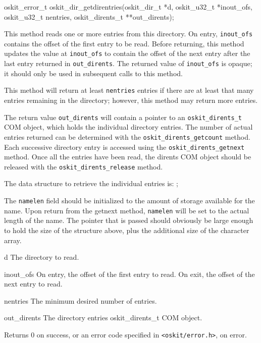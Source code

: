 \begin{apisyn}

	\funcproto oskit_error_t
	oskit_dir_getdirentries(oskit_dir_t *d, 
				oskit_u32_t *inout_ofs,
				oskit_u32_t nentries,
				\outparam oskit_dirents_t **out_dirents);
\end{apisyn}
\ostofs
\begin{apidesc}
	This method reads one or more entries from this
	directory.  On entry, {\tt inout_ofs} contains the	
	offset of the first entry to be read.  Before
	returning, this method updates the value at 
	{\tt inout_ofs} to contain the offset of the
	next entry after the last entry	returned in
	{\tt out_dirents}.  The returned value of 
	{\tt inout_ofs} is opaque; it should only be used 
	in subsequent calls to this method.

	This method will return at least {\tt nentries}
	entries if there are at least that many entries
	remaining in the directory; however, this method
	may return more entries.

	The return value {\tt out_dirents} will contain a pointer to
	an {\tt oskit_dirents_t} COM object, which holds the individual
	directory entries. The number of actual entries returned can be
	determined with the {\tt oskit_dirents_getcount} method. Each
	successive directory entry is accessed using the
	{\tt oskit_dirents_getnext} method. Once all the entries have
	been read, the dirents COM object should be released with the
	{\tt oskit_dirents_release} method.

	The data structure to retrieve the individual entries is:
	;

	The {\tt namelen} field should be initialized to the amount of
	storage available for the name. Upon return from the getnext
	method, {\tt namelen} will be set to the actual length of the
	name. The pointer that is passed should obviously be large
	enough to hold the size of the structure above, plus the
	additional size of the character array.

\end{apidesc}
\begin{apiparm}
	\item[d]
		The directory to read.
	\item[inout_ofs]
		On entry, the offset of the first entry to read.
		On exit, the offset of the next entry to read.
	\item[nentries]
		The minimum desired number of entries.
	\item[out_dirents]
		The directory entries oskit_dirents_t COM object.
\end{apiparm}
\begin{apiret}
	Returns 0 on success, or an error code specified in
	{\tt <oskit/error.h>}, on error.
\end{apiret}


